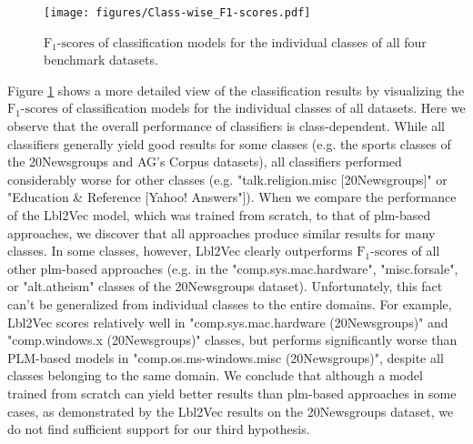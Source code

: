 \documentclass[sigconf]{acmart}
\begin{document}
\begin{figure}[!hb]
    \centering
    \texttt{[image: figures/Class-wise\_F1-scores.pdf]}
    \caption{$\text{F}_{1}\text{-scores}$ of classification models for the individual classes of all four benchmark datasets.}
    \label{fig:class-wise_f1}
\end{figure}

\newpage

Figure \ref{fig:class-wise_f1} shows a more detailed view of the classification results by visualizing the $\text{F}_{1}\text{-scores}$ of classification models for the individual classes of all datasets. Here we observe that the overall performance of classifiers is class-dependent. While all classifiers generally yield good results for some classes (e.g. the sports classes of the 20Newsgroups and AG's Corpus datasets), all classifiers performed considerably worse for other classes (e.g. "talk.religion.misc [20Newsgroups]" or "Education \& Reference [Yahoo! Answers"]). When we compare the performance of the Lbl2Vec model, which was trained from scratch, to that of \ac{plm}-based approaches, we discover that all approaches produce similar results for many classes. In some classes, however, Lbl2Vec clearly outperforms $\text{F}_{1}\text{-scores}$ of all other \ac{plm}-based approaches (e.g. in the "comp.sys.mac.hardware", "misc.forsale", or "alt.atheism" classes of the 20Newsgroups dataset). Unfortunately, this fact can't be generalized from individual classes to  the entire domains. For example, Lbl2Vec scores relatively well in "comp.sys.mac.hardware (20Newsgroups)" and "comp.windows.x (20Newsgroups)" classes, but performs significantly worse than PLM-based models in "comp.os.ms-windows.misc (20Newsgroups)", despite all classes belonging to the same domain. We conclude that although a model trained from scratch can yield better results than \ac{plm}-based approaches in some cases, as demonstrated by the Lbl2Vec results on the 20Newsgroups dataset, we do not find sufficient support for our third hypothesis.
\end{document}
